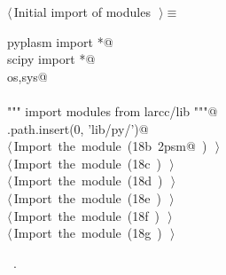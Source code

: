 \documentclass[11pt,oneside]{article}	%
\begin{document}
\begin{flushleft} \small \label{scrap41}
$\langle\,$Initial import of modules\nobreak\ {\footnotesize {}}$\,\rangle\equiv$
\vspace{-1ex}
\begin{list}{}{} \item
\mbox{}\verb@from pyplasm import *@\\
\mbox{}\verb@from scipy import *@\\
\mbox{}\verb@import os,sys@\\
\mbox{}\verb@@\\
\mbox{}\verb@""" import modules from larcc/lib """@\\
\mbox{}\verb@sys.path.insert(0, 'lib/py/')@\\
\mbox{}\verb@@\hbox{$\langle\,$Import the module\nobreak\ ({\footnotesize 18b\label{scrap42}
 }\mbox{}\verb@lar2psm@ ) {\footnotesize {}}$\,\rangle$}\verb@@\\
\mbox{}\verb@@\hbox{$\langle\,$Import the module\nobreak\ ({\footnotesize 18c\label{scrap43}
 }\mbox{}\verb@simplexn@ ) {\footnotesize {}}$\,\rangle$}\verb@@\\
\mbox{}\verb@@\hbox{$\langle\,$Import the module\nobreak\ ({\footnotesize 18d\label{scrap44}
 }\mbox{}\verb@larcc@ ) {\footnotesize {}}$\,\rangle$}\verb@@\\
\mbox{}\verb@@\hbox{$\langle\,$Import the module\nobreak\ ({\footnotesize 18e\label{scrap45}
 }\mbox{}\verb@largrid@ ) {\footnotesize {}}$\,\rangle$}\verb@@\\
\mbox{}\verb@@\hbox{$\langle\,$Import the module\nobreak\ ({\footnotesize 18f\label{scrap46}
 }\mbox{}\verb@myfont@ ) {\footnotesize {}}$\,\rangle$}\verb@@\\
\mbox{}\verb@@\hbox{$\langle\,$Import the module\nobreak\ ({\footnotesize 18g\label{scrap47}
 }\mbox{}\verb@mapper@ ) {\footnotesize {}}$\,\rangle$}\verb@@\\
\mbox{}\verb@@{\NWsep}
\end{list}
\vspace{-1ex}
\footnotesize\addtolength{\baselineskip}{-1ex}
\begin{list}{}{\setlength{\itemsep}{-\parsep}\setlength{\itemindent}{-\leftmargin}}
\item \NWtxtMacroRefIn\ .
\end{list}
\end{flushleft}
\end{document}
